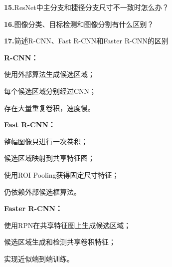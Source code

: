 \documentclass[UTF8,openany,oneside,zihao=-4,fontset=windows]{ctexbook}
\newif\ifshowsolutions
\newcommand{\Question}[2]{%
  \par\Needspace{4\baselineskip}\medskip
  \noindent\textbf{\color{MVBlue}#1}\quad #2\par
}
\newenvironment{AnswerBox}{\begin{tcolorbox}[breakable,colback=MVLight,colframe=MVBlue!45,title={参考答案},fonttitle=\bfseries,boxrule=0.55pt,arc=1.5mm,left=2mm,right=2mm,top=1.5mm,bottom=1.5mm]}{\end{tcolorbox}}
\newcommand{\PracticeSpace}[1]{\ifshowsolutions\else\par\vspace{#1}\par\fi}
\begin{document}
\else
\PracticeSpace{2.4cm}
\fi
\Question{15.}{ResNet中主分支和捷径分支尺寸不一致时怎么办？}
\ifshowsolutions
\begin{AnswerBox}
\par 残差相加要求两条分支的形状完全相同。
\par\noindent\textbf{如果通道数或空间尺寸不同，可以在捷径分支使用：}
\par 1×1
\par\noindent\textbf{卷积，并设置适当的步长，实现：}
\par\noindent\textbullet\quad 通道数调整；
\par\noindent\textbullet\quad 特征图下采样；
\par 尺寸匹配。
\par 之后再进行逐元素相加。
\end{AnswerBox}
\else
\PracticeSpace{2.4cm}
\fi
\Question{16.}{图像分类、目标检测和图像分割有什么区别？}
\ifshowsolutions
\begin{AnswerBox}
\par\noindent\textbf{图像分类：}
\par 判断整幅图像属于哪个类别，只输出类别。
\par\noindent\textbf{目标检测：}
\par 同时输出图像中目标的类别和边界框位置。
\par\noindent\textbf{图像分割：}
\par 对每个像素进行分类，输出与输入图像空间对应的像素级结果。
\par\noindent\textbf{因此三者输出信息从粗到细为：}
\par 整图类别→类别＋位置→逐像素类别
\end{AnswerBox}
\else
\PracticeSpace{2.4cm}
\fi
\Question{17.}{简述R-CNN、Fast R-CNN和Faster R-CNN的区别}
\ifshowsolutions
\begin{AnswerBox}
\par\noindent\textbf{R-CNN：}
\par\noindent\textbullet\quad 使用外部算法生成候选区域；
\par\noindent\textbullet\quad 每个候选区域分别经过CNN；
\par 存在大量重复卷积，速度慢。
\par\noindent\textbf{Fast R-CNN：}
\par\noindent\textbullet\quad 整幅图像只进行一次卷积；
\par\noindent\textbullet\quad 候选区域映射到共享特征图；
\par\noindent\textbullet\quad 使用ROI Pooling获得固定尺寸特征；
\par 仍依赖外部候选框算法。
\par\noindent\textbf{Faster R-CNN：}
\par\noindent\textbullet\quad 使用RPN在共享特征图上生成候选区域；
\par\noindent\textbullet\quad 候选区域生成和检测共享卷积特征；
\par 实现近似端到端训练。
\end{AnswerBox}
\end{document}
